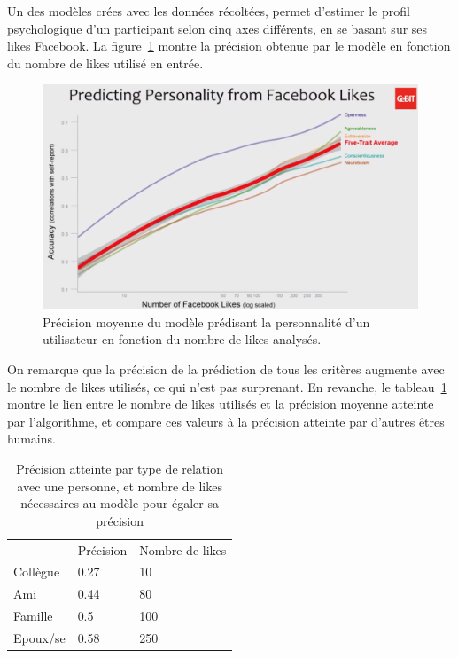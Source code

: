 		Un des modèles crées avec les données récoltées, permet d'estimer le profil psychologique d'un participant selon cinq axes différents, en se basant sur ses likes Facebook. La figure~\ref{a-talk1} montre la précision obtenue par le modèle en fonction du nombre de likes utilisé en entrée.

		\begin{figure}[ht]
			\centering
			\includegraphics[width=1\textwidth]{images/analysis/talk1}
			\caption{Précision moyenne du modèle prédisant la personnalité d'un utilisateur en fonction du nombre de likes analysés\cite{kosinski-talk}.}
			\label{a-talk1}
		\end{figure}

		On remarque que la précision de la prédiction de tous les critères augmente avec le nombre de likes utilisés, ce qui n'est pas surprenant. En revanche, le tableau~\ref{a-talk-table1} montre le lien entre le nombre de likes utilisés et la précision moyenne atteinte par l'algorithme, et compare ces valeurs à la précision atteinte par d'autres êtres humains.

		\begin{table}[]
			\centering
			\begin{tabular}{lll}
				         & Précision & Nombre de likes \\
				Collègue & 0.27      & 10                            \\
				Ami      & 0.44      & 80                            \\
				Famille  & 0.5       & 100                           \\
				Epoux/se & 0.58      & 250                          
			\end{tabular}
			\caption{Précision atteinte par type de relation avec une personne, et nombre de likes nécessaires au modèle pour égaler sa précision}
			\label{a-talk-table1}
		\end{table}

